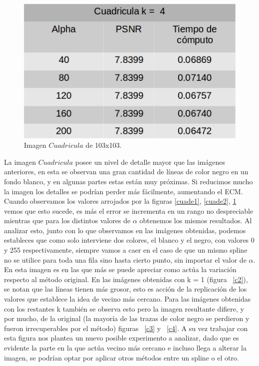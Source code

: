 \documentclass[a4paper]{article}
\newcounter{col}
\begin{document}
    \begin{figure}[H]
    \centering
    \includegraphics[scale=0.4]{imagenes/cua4.jpg}
    \caption{Imagen $Cuadricula$ de 103x103.}
	\label{cuade3}
    \end{figure}
    
La imagen $Cuadricula$ posee un nivel de detalle mayor que las imágenes anteriores, en esta se observan una gran cantidad de líneas de color negro en un fondo blanco, y en algunas partes estas están muy próximas.
 Si reducimos mucho la imagen los detalles se podrían perder más fácilmente, aumentando el ECM. Cuando observamos los valores arrojados por la figuras \ref{cuade1}, \ref{cuade2}, \ref{cuade3} vemos que esto sucede, es más el error se incrementa en un rango no despreciable mientras que para los distintos valores de  $\alpha$ obtenemos los mismos resultados. Al analizar esto, junto con lo que observamos en las imágenes obtenidas, podemos estableces que como solo interviene dos colores, el blanco y el negro, con valores 0 y 255 respectivamente, siempre vamos a caer en el caso de que un mismo spline no se utilice para toda una fila sino hasta cierto punto, sin importar el valor de $\alpha$.
 En esta imagen es en las que más se puede apreciar como actúa la variación respecto al método original. En las imágenes obtenidas con  k = 1 (figura ~\ref{c2}), se notan que las líneas tienen más grosor, esto es acción de la replicación de los valores que establece la idea de vecino más cercano. Para las imágenes obtenidas con los restantes k también se observa esto pero la imagen resultante difiere, y por mucho, de la original (la mayoría de las trazas de color negro se perdieron y fueron irrecuperables por el método) figuras ~\ref{c3} y  ~\ref{c4}. A su vez trabajar con esta figura nos plantea un nuevo posible experimento a analizar, dado que es evidente la parte en la que actúa vecino más cercano e incluso llega a alterar la imagen, se podrían optar por aplicar otros métodos entre un spline o el otro.
 
\end{document}
